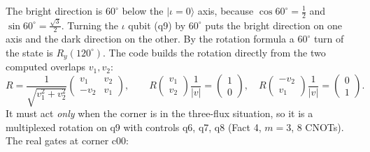 \documentclass[11pt]{article}
\providecommand{\ket}[1]{|#1\rangle}
\newcommand{\Ry}{R_y}
\begin{document}
\begin{center}
\end{center}
The bright direction is $60^\circ$ below the $\ket{\iota{=}0}$ axis, because $\cos60^\circ=\tfrac12$ and
$\sin60^\circ=\tfrac{\sqrt3}2$.  Turning the $\iota$ qubit (q9) by $60^\circ$ puts the bright direction on one
axis and the dark direction on the other.  By the rotation formula a $60^\circ$ turn of the state is
$\Ry(120^\circ)$.  The code builds the rotation directly from the two computed overlaps $v_1,v_2$:
\[
R=\frac1{\sqrt{v_1^2+v_2^2}}\begin{pmatrix}v_1&v_2\\-v_2&v_1\end{pmatrix},\qquad
R\begin{pmatrix}v_1\\v_2\end{pmatrix}\!\frac{1}{|v|}=\begin{pmatrix}1\\0\end{pmatrix},\quad
R\begin{pmatrix}-v_2\\v_1\end{pmatrix}\!\frac{1}{|v|}=\begin{pmatrix}0\\1\end{pmatrix}.
\]
It must act \emph{only} when the corner is in the three-flux situation, so it is a multiplexed rotation on q9
with controls q6, q7, q8 (Fact 4, $m=3$, 8 CNOTs).  The real gates at corner c00:
\begin{center}
\end{center}
\end{document}
